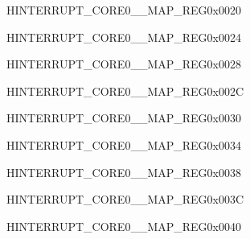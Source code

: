\begin{register}{H}{INTERRUPT\_CORE0\_\_MAP\_REG}{0x0020}\label{regdesc:INTERRUPTCORE0RWBLEIRQMAPREG}
\end{register}
\vspace{-3em}

\begin{register}{H}{INTERRUPT\_CORE0\_\_MAP\_REG}{0x0024}\label{regdesc:INTERRUPTCORE0RWBTNMIMAPREG}
\end{register}
\vspace{-3em}

\begin{register}{H}{INTERRUPT\_CORE0\_\_MAP\_REG}{0x0028}\label{regdesc:INTERRUPTCORE0RWBLENMIMAPREG}
\end{register}
\vspace{-3em}

\begin{register}{H}{INTERRUPT\_CORE0\_\_MAP\_REG}{0x002C}\label{regdesc:INTERRUPTCORE0I2CMSTINTMAPREG}
\end{register}
\vspace{-3em}

\begin{register}{H}{INTERRUPT\_CORE0\_\_MAP\_REG}{0x0030}\label{regdesc:INTERRUPTCORE0SLC0INTRMAPREG}
\end{register}
\vspace{-3em}

\begin{register}{H}{INTERRUPT\_CORE0\_\_MAP\_REG}{0x0034}\label{regdesc:INTERRUPTCORE0SLC1INTRMAPREG}
\end{register}
\vspace{-3em}

\begin{register}{H}{INTERRUPT\_CORE0\_\_MAP\_REG}{0x0038}\label{regdesc:INTERRUPTCORE0UHCI0INTRMAPREG}
\end{register}
\vspace{-3em}

\begin{register}{H}{INTERRUPT\_CORE0\_\_MAP\_REG}{0x003C}\label{regdesc:INTERRUPTCORE0UHCI1INTRMAPREG}
\end{register}
\vspace{-3em}

\begin{register}{H}{INTERRUPT\_CORE0\_\_MAP\_REG}{0x0040}\label{regdesc:INTERRUPTCORE0GPIOINTERRUPTPROMAPREG}
\end{register}
\vspace{-3em}

